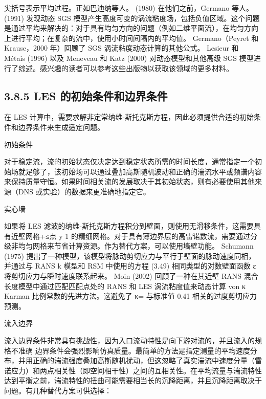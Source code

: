 \documentclass[11pt,a4paper,openany,fontset=none]{ctexbook}
\begin{document}
尖括号表示平均过程。正如巴迪纳等人。 (1980) 在他们之前，Germano 等人。 (1991) 发现动态 SGS 模型产生高度可变的涡流粘度场，包括负值区域。这个问题是通过平均来解决的：对于具有均匀方向的问题（例如二维平面流），在均匀方向上进行平均；在复杂的流中，使用小时间间隔内的平均值。 Germano（Peyret 和 Krause，2000 年）回顾了 SGS 涡流粘度动态计算的其他公式。 Lesieur 和 Métais (1996) 以及 Meneveau 和 Katz (2000) 对动态模型和其他高级 SGS 模型进行了综述。感兴趣的读者可以参考这些出版物以获取该领域的更多材料。

\subsection*{3.8.5 LES 的初始条件和边界条件}

在 LES 计算中，需要求解非定常纳维-斯托克斯方程，因此必须提供合适的初始条件和边界条件来生成适定问题。

初始条件

对于稳定流，流的初始状态仅决定达到稳定状态所需的时间长度，通常指定一个初始场就足够了，该初始场可以通过叠加高斯随机波动和正确的湍流水平或频谱内容来保持质量守恒。如果时间相关流的发展取决于其初始状态，则有必要使用其他来源（DNS 或实验）的数据来更准确地指定它。

实心墙

如果将 LES 滤波的纳维-斯托克斯方程积分到壁面，则使用无滑移条件，这需要具有近壁网格+≤点 y 1 的精细网格。对于具有薄边界层的高雷诺数流，需要通过分级非均匀网格来节省计算资源。作为替代方案，可以使用墙壁功能。 Schumann (1975) 提出了一种模型，该模型将脉动剪切应力与平行于壁面的脉动速度同相，并通过与 RANS k 模型和 RSM 中使用的方程 (3.49) 相同类型的对数壁面函数 ε 将剪切应力与瞬时速度联系起来。 Moin (2002) 回顾了一种在其近壁 RANS 混合长度模型中通过匹配匹配点处的 RANS 和 LES 涡流粘度值来动态计算 von κ Karman 比例常数的先进方法。这避免了 κ= 与标准值 0.41 相关的过度剪切应力预测。

流入边界

流入边界条件非常具有挑战性，因为入口流动特性是向下游对流的，并且流入的规格不准确
边界条件会强烈影响仿真质量。最简单的方法是指定测量的平均速度分布，并用正确的湍流强度叠加高斯随机扰动，但这忽略了真实湍流中速度分量（雷诺应力）和两点相关性（即空间相干性）之间的互相关性。在平均流量与湍流特性达到平衡之前，湍流特性的扭曲可能需要相当长的沉降距离，并且沉降距离取决于问题。有几种替代方案可供选择：
\end{document}
